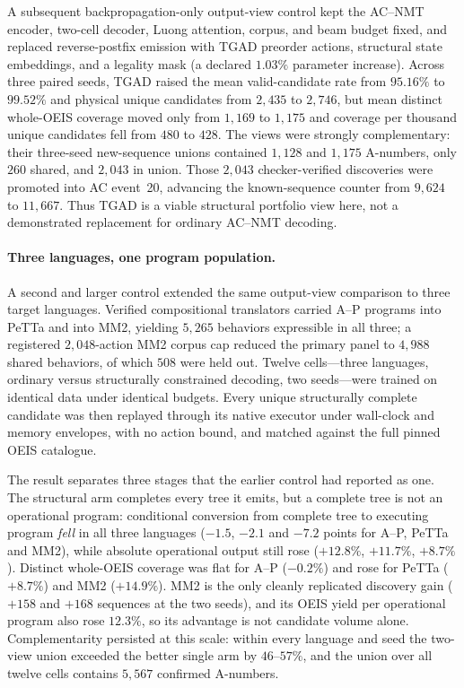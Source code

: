\documentclass[11pt]{article}
\begin{document}
A subsequent backpropagation-only output-view control kept the AC--NMT encoder, two-cell
decoder, Luong attention, corpus, and beam budget fixed, and replaced reverse-postfix
emission with TGAD preorder actions, structural state embeddings, and a legality mask
(a declared $1.03\%$ parameter increase).  Across three paired seeds, TGAD raised the
mean valid-candidate rate from $95.16\%$ to $99.52\%$ and physical unique candidates from
$2{,}435$ to $2{,}746$, but mean distinct whole-OEIS coverage moved only from $1{,}169$
to $1{,}175$ and coverage per thousand unique candidates fell from $480$ to $428$.
The views were strongly complementary: their three-seed new-sequence unions contained
$1{,}128$ and $1{,}175$ A-numbers, only $260$ shared, and $2{,}043$ in union.  Those
$2{,}043$ checker-verified discoveries were promoted into AC event~20, advancing the
known-sequence counter from $9{,}624$ to $11{,}667$.  Thus TGAD is a viable structural
portfolio view here, not a demonstrated replacement for ordinary AC--NMT decoding.

\paragraph{Three languages, one program population.}
A second and larger control extended the same output-view comparison to three target
languages.  Verified compositional translators carried A--P programs into PeTTa and into
MM2, yielding $5{,}265$ behaviors expressible in all three; a registered $2{,}048$-action
MM2 corpus cap reduced the primary panel to $4{,}988$ shared behaviors, of which $508$
were held out.  Twelve cells---three languages, ordinary versus structurally constrained
decoding, two seeds---were trained on identical data under identical budgets.  Every
unique structurally complete candidate was then replayed through its native executor
under wall-clock and memory envelopes, with no action bound, and matched against the
full pinned OEIS catalogue.

The result separates three stages that the earlier control had reported as one.  The
structural arm completes every tree it emits, but a complete tree is not an operational
program: conditional conversion from complete tree to executing program \emph{fell} in
all three languages ($-1.5$, $-2.1$ and $-7.2$ points for A--P, PeTTa and MM2), while
absolute operational output still rose ($+12.8\%$, $+11.7\%$, $+8.7\%$).  Distinct
whole-OEIS coverage was flat for A--P ($-0.2\%$) and rose for PeTTa ($+8.7\%$) and MM2
($+14.9\%$).  MM2 is the only cleanly replicated discovery gain ($+158$ and $+168$
sequences at the two seeds), and its OEIS yield per operational program also rose
$12.3\%$, so its advantage is not candidate volume alone.  Complementarity persisted at
this scale: within every language and seed the two-view union exceeded the better single
arm by $46$--$57\%$, and the union over all twelve cells contains $5{,}567$ confirmed
A-numbers.
\end{document}
